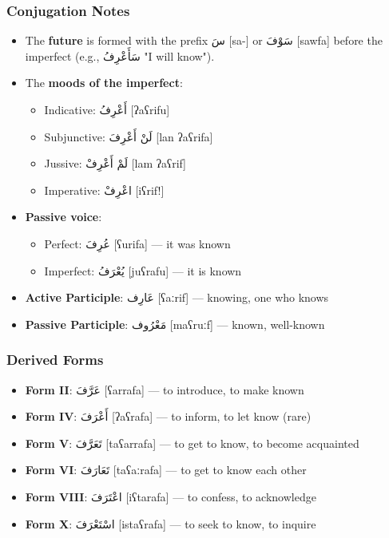 \documentclass[letterpaper,12pt]{article}
\begin{document}
\subsubsection*{Conjugation Notes}
\begin{itemize}
  \item The \textbf{future} is formed with the prefix \textarabic{سَ} [sa-] or \textarabic{سَوْفَ} [sawfa] before the imperfect (e.g., \textarabic{سَأَعْرِفُ} "I will know").
  \item The \textbf{moods of the imperfect}: 
    \begin{itemize}
      \item Indicative: \textarabic{أَعْرِفُ} [ʔaʕrifu] 
      \item Subjunctive: \textarabic{لَنْ أَعْرِفَ} [lan ʔaʕrifa]
      \item Jussive: \textarabic{لَمْ أَعْرِفْ} [lam ʔaʕrif]
      \item Imperative: \textarabic{اعْرِفْ} [iʕrif!]
    \end{itemize}
  \item \textbf{Passive voice}: 
    \begin{itemize}
      \item Perfect: \textarabic{عُرِفَ} [ʕurifa] — it was known
      \item Imperfect: \textarabic{يُعْرَفُ} [juʕrafu] — it is known
    \end{itemize}
  \item \textbf{Active Participle}: \textarabic{عَارِف} [ʕaːrif] — knowing, one who knows
  \item \textbf{Passive Participle}: \textarabic{مَعْرُوف} [maʕruːf] — known, well-known
\end{itemize}

\subsubsection*{Derived Forms}
\begin{itemize}
  \item \textbf{Form II}: \textarabic{عَرَّفَ} [ʕarrafa] — to introduce, to make known
  \item \textbf{Form IV}: \textarabic{أَعْرَفَ} [ʔaʕrafa] — to inform, to let know (rare)
  \item \textbf{Form V}: \textarabic{تَعَرَّفَ} [taʕarrafa] — to get to know, to become acquainted
  \item \textbf{Form VI}: \textarabic{تَعَارَفَ} [taʕaːrafa] — to get to know each other
  \item \textbf{Form VIII}: \textarabic{اعْتَرَفَ} [iʕtarafa] — to confess, to acknowledge
  \item \textbf{Form X}: \textarabic{اسْتَعْرَفَ} [istaʕrafa] — to seek to know, to inquire
\end{itemize}
\end{document}
